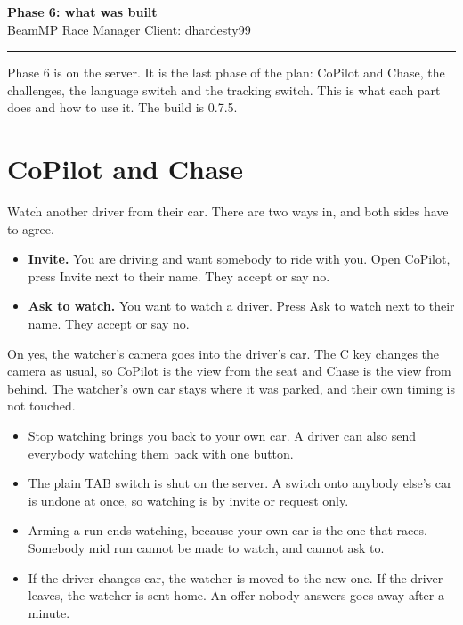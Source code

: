 \documentclass[11pt,a4paper]{article}
\begin{document}
\begin{center}
{\LARGE\bfseries Phase 6: what was built}\\[4pt]
{\small BeamMP Race Manager \quad Client: dhardesty99}
\end{center}

\vspace{4pt}
\hrule
\vspace{8pt}

Phase 6 is on the server. It is the last phase of the plan: CoPilot and
Chase, the challenges, the language switch and the tracking switch. This
is what each part does and how to use it. The build is 0.7.5.

\section{CoPilot and Chase}

Watch another driver from their car. There are two ways in, and both sides
have to agree.

\begin{itemize}
  \item \textbf{Invite.} You are driving and want somebody to ride with
        you. Open CoPilot, press Invite next to their name. They accept or
        say no.
  \item \textbf{Ask to watch.} You want to watch a driver. Press Ask to
        watch next to their name. They accept or say no.
\end{itemize}

On yes, the watcher's camera goes into the driver's car. The C key changes
the camera as usual, so CoPilot is the view from the seat and Chase is the
view from behind. The watcher's own car stays where it was parked, and
their own timing is not touched.

\begin{itemize}
  \item Stop watching brings you back to your own car. A driver can also
        send everybody watching them back with one button.
  \item The plain TAB switch is shut on the server. A switch onto anybody
        else's car is undone at once, so watching is by invite or request
        only.
  \item Arming a run ends watching, because your own car is the one that
        races. Somebody mid run cannot be made to watch, and cannot ask
        to.
  \item If the driver changes car, the watcher is moved to the new one. If
        the driver leaves, the watcher is sent home. An offer nobody
        answers goes away after a minute.
\end{itemize}
\end{document}
